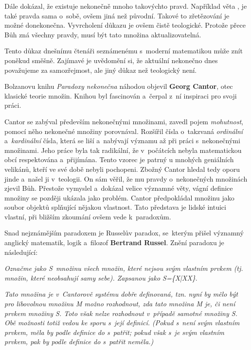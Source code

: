 \documentclass[czech]{article}
\begin{document}
Dále dokázal, že existuje nekonečně mnoho takovýchto pravd. Například věta , je také pravda sama o~sobě, ovšem jiná než původní. Takové to zřetězování je možné donekonečna. Vyvrcholení důkazu je ovšem čistě teologické. Protože přece Bůh zná všechny pravdy, musí být tato množina aktualizovatelná.\cite{vopenka}

Tento důkaz dnešnímu čtenáři seznámenému s~moderní matematikou může znít poněkud směšně. Zajímavé je uvědomění si, že aktuální nekonečno dnes považujeme za samozřejmost, ale jiný důkaz než teologický není.

Bolzanovu knihu \textit{Paradoxy nekonečna} náhodou objevil \textbf{Georg Cantor}, otec klasické teorie množin. Knihou byl fascinován a~čerpal z~ní inspiraci pro svoji práci.

Cantor se zabýval především nekonečnými množinami, zavedl pojem \textit{mohutnost}, pomocí něho nekonečné množiny porovnával. Rozšířil čísla o~takzvaná \textit{ordinální} a~\textit{kardinální} čísla, která se liší a~nabývají významu až při práci s~nekonečnými množinami. Jeho práce byla tak radikální, že v~počátcích nebyla matematickou obcí respektována a~přijímána. Tento vzorec je patrný u mnohých geniálních velikánů, kteří ve své době nebyli pochopeni. Zbožný Cantor hledal tedy oporu jinde a~našel ji v~teologii. On sám věřil, že mu pravdy o~nekonečných množinách zjevil Bůh. Přestože vymyslel a~dokázal velice významné věty, vágní definice množiny se později ukázala jako problém.
Cantor předpokládal množinu jako soubor objektů splňující nějakou vlastnost. Tato představa je lidské intuici vlastní, při bližším zkoumání ovšem vede k~paradoxům.

Snad nejznámějším paradoxem je Russelův paradox, se~kterým přišel významný anglický matematik, logik a~filozof \textbf{Bertrand Russel}.\cite{russell_paradox} Znění paradoxu je následující:

\begin{flushleft}
\textit{Označme jako S~množinu všech množin, které nejsou svým vlastním prvkem (tj. množin, které neobsahují samy sebe). Zapsanou jako {\displaystyle S=\{X|X\notin X\}}}.

\textit{Tato množina je v~Cantorově systému dobře definovaná, tzn. nyní by mělo být pro libovolnou množinu M možno rozhodnout, zda tato množina M je, či není prvkem množiny S. Toto však nelze rozhodnout v~případě samotné množiny S. Obě možnosti totiž vedou ke sporu s~její definicí. (Pokud s~není svým vlastním prvkem, měla by podle definice do s~patřit; pokud však s~je svým vlastním prvkem, pak by podle definice do s~patřit neměla.)}

\end{flushleft}
\end{document}
